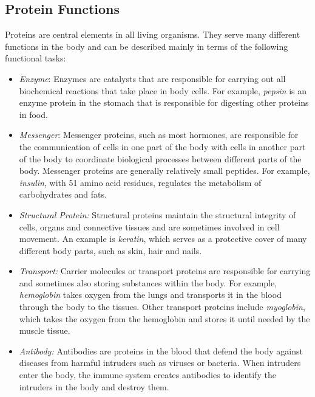\subsection{Protein Functions}

Proteins are central elements in all living organisms. They serve many different functions in the body and can be described mainly in terms of the following functional tasks:

\begin{itemize}

\item \textit{Enzyme}: Enzymes are catalysts that are responsible for carrying out all biochemical reactions that take place in body cells. For example, \textit{pepsin} is an enzyme protein in the stomach that is responsible for digesting other proteins in food.

\item \textit{Messenger}: Messenger proteins, such as most hormones, are responsible for the communication of cells in one part of the body with cells in another part of the body to coordinate biological processes between different parts of the body. Messenger proteins are generally relatively small peptides. For example, \textit{insulin}, with 51 amino acid residues, regulates the metabolism of carbohydrates and fats.


\item \textit{Structural Protein:}
Structural proteins maintain the structural integrity of cells, organs and connective tissues and are sometimes involved in cell movement. An example is \textit{keratin}, which serves as a protective cover of many different body parts, such as skin, hair and nails.

\item \textit{Transport:}
Carrier molecules or transport proteins are responsible for carrying and sometimes also storing substances within the body. For example, \textit{hemoglobin} takes oxygen from the lungs and transports it in the blood through the body to the tissues. Other transport proteins include \textit{myoglobin}, which takes the oxygen from the hemoglobin and stores it until needed by the muscle tissue.


\item \textit{Antibody:}
Antibodies are proteins in the blood that defend the body against diseases from harmful intruders such as viruses or bacteria. When intruders enter the body, the immune system creates antibodies to identify the intruders in the body and destroy them.

\end{itemize}
 

